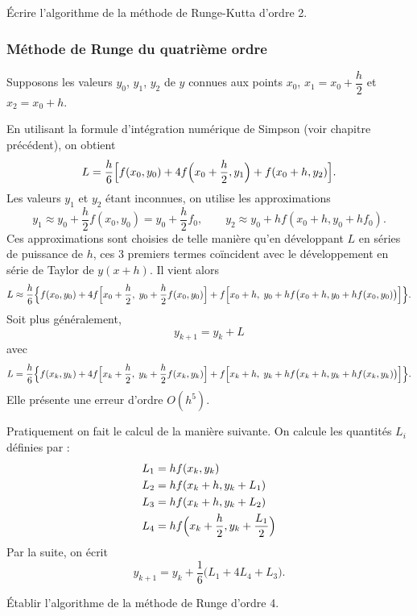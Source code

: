 \begin{exercice}
Écrire l'algorithme de la méthode de Runge-Kutta d'ordre 2.
\end{exercice}

\subsubsection{Méthode de Runge du quatrième ordre}

Supposons les valeurs $y_0$, $y_1$, $y_2$ de $y$ connues aux points $x_0$,
$x_1 = x_0 + \dfrac{h}{2}$ et $x_2 = x_0 + h$.

En utilisant la formule d'intégration numérique de Simpson (voir chapitre
précédent), on obtient
\[
  L = \frac{h}{6}\Bigl[f(x_0, y_0) + 4f\Bigl(x_0 + \frac{h}{2}, y_1\Bigr) + f(x_0 + h, y_2)\Bigr].
\]
Les valeurs $y_1$ et $y_2$ étant inconnues, on utilise les approximations
\[
  y_1 \approx y_0 + \frac{h}{2}f(x_0, y_0) = y_0 + \frac{h}{2}f_0, \qquad
  y_2 \approx y_0 + hf(x_0 + h, y_0 + hf_0) .
\]
Ces approximations sont choisies de telle manière qu'en développant $L$ en
séries de puissance de $h$, ces 3 premiers termes coïncident avec le
développement en série de Taylor de $y(x+h)$. Il vient alors
\[
  L \approx \frac{h}{6}\Bigl\{f(x_0, y_0)
     + 4f\Bigl[x_0 + \frac{h}{2},\; y_0 + \frac{h}{2}f(x_0, y_0)\Bigr]
     + f\Bigl[x_0 + h,\; y_0 + hf\bigl(x_0 + h, y_0 + hf(x_0, y_0)\bigr)\Bigr]\Bigr\}.
\]
Soit plus généralement,
\[
  y_{k+1} = y_k + L
\]
avec
\[
  L = \frac{h}{6}\Bigl\{f(x_k, y_k)
     + 4f\Bigl[x_k + \frac{h}{2},\; y_k + \frac{h}{2}f(x_k, y_k)\Bigr]
     + f\Bigl[x_k + h,\; y_k + hf\bigl(x_k + h, y_k + hf(x_k, y_k)\bigr)\Bigr]\Bigr\}.
\]
Elle présente une erreur d'ordre $O(h^5)$.

Pratiquement on fait le calcul de la manière suivante. On calcule les quantités
$L_i$ définies par :
\[
  \begin{aligned}
    L_1 &= hf(x_k, y_k)\\
    L_2 &= hf(x_k + h, y_k + L_1)\\
    L_3 &= hf(x_k + h, y_k + L_2)\\
    L_4 &= hf\Bigl(x_k + \frac{h}{2}, y_k + \frac{L_1}{2}\Bigr)
  \end{aligned}
\]
Par la suite, on écrit
\[
  y_{k+1} = y_k + \frac{1}{6}\bigl(L_1 + 4L_4 + L_3\bigr).
\]

\begin{exercice}
Établir l'algorithme de la méthode de Runge d'ordre 4.
\end{exercice}

